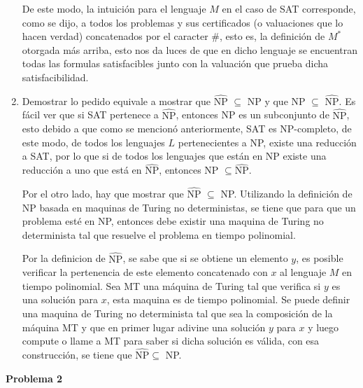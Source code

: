 \documentclass[letterpaper,10pt]{article}
\begin{document}
\begin{enumerate}
    De este modo, la intuición para el lenguaje $M$ en el caso de SAT corresponde, como se dijo, a todos los problemas y sus certificados (o valuaciones que lo hacen verdad) concatenados por el caracter $\#$, esto es, la definición de $M^*$ otorgada más arriba, esto nos da luces de que en dicho lenguaje se encuentran todas las formulas satisfacibles junto con la valuación que prueba dicha satisfacibilidad.

    \item Demostrar lo pedido equivale a mostrar que $\hat{\text{NP}}$ $\subseteq$ NP y que NP $\subseteq$ $\hat{\text{NP}}$. Es fácil ver que si SAT pertenece a $\hat{\text{NP}}$, entonces NP es un subconjunto de $\hat{\text{NP}}$, esto debido a que como se mencionó anteriormente, SAT es NP-completo, de este modo, de todos los lenguajes $L$ pertenecientes a NP, existe una reducción a SAT, por lo que si de todos los lenguajes que están en NP existe una reducción a uno que está en $\hat{\text{NP}}$, entonces NP $\subseteq \hat{\text{NP}}$.

    Por el otro lado, hay que mostrar que $\hat{\text{NP}}$ $\subseteq$ NP. Utilizando la definición de NP basada en maquinas de Turing no deterministas, se tiene que para que un problema esté en NP, entonces debe existir una maquina de Turing no determinista tal que resuelve el problema en tiempo polinomial.

    Por la definicion de $\hat{\text{NP}}$, se sabe que si se obtiene un elemento $y$, es posible verificar la pertenencia de este elemento concatenado con $x$ al lenguaje $M$ en tiempo polinomial. Sea MT una máquina de Turing tal que verifica si $y$ es una solución para $x$, esta maquina es de tiempo polinomial. Se puede definir una maquina de Turing no determinista tal que sea la composición de la máquina MT y que en primer lugar adivine una solución $y$ para $x$ y luego compute o llame a MT para saber si dicha solución es válida, con esa construcción, se tiene que $\hat{\text{NP}} \subseteq$ NP.
\end{enumerate}


\textbf{Problema 2}
\end{document}
